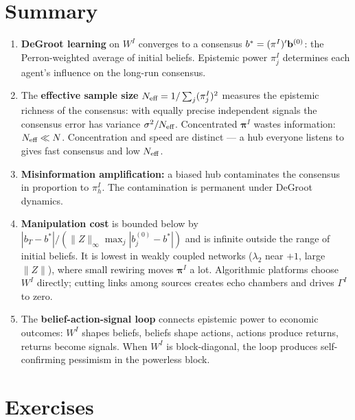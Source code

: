 \documentclass[../structural_economics_book.tex]{subfiles}
\begin{document}
\section{Summary}
\label{ch08:sec:summary}

\begin{enumerate}
\item \textbf{DeGroot learning} on $W^I$ converges to a consensus $b^* = (\pi^I)'\mathbf{b}^{(0)}$: the Perron-weighted average of initial beliefs. Epistemic power $\pi^I_j$ determines each agent's influence on the long-run consensus.

\item The \textbf{effective sample size} $N_{\text{eff}} = 1/\sum_j (\pi^I_j)^2$ measures the epistemic richness of the consensus: with equally precise independent signals the consensus error has variance $\sigma^2/N_{\text{eff}}$. Concentrated $\boldsymbol{\pi}^I$ wastes information: $N_{\text{eff}} \ll N$. Concentration and speed are distinct --- a hub everyone listens to gives fast consensus and low $N_{\text{eff}}$.

\item \textbf{Misinformation amplification:} a biased hub contaminates the consensus in proportion to $\pi^I_h$. The contamination is permanent under DeGroot dynamics.

\item \textbf{Manipulation cost} is bounded below by $|b_T - b^*| / (\|Z\|_\infty \max_j|b^{(0)}_j - b^*|)$ and is infinite outside the range of initial beliefs. It is lowest in weakly coupled networks ($\lambda_2$ near $+1$, large $\|Z\|$), where small rewiring moves $\boldsymbol{\pi}^I$ a lot. Algorithmic platforms choose $W^I$ directly; cutting links among sources creates echo chambers and drives $\Gamma^I$ to zero.

\item The \textbf{belief-action-signal loop} connects epistemic power to economic outcomes: $W^I$ shapes beliefs, beliefs shape actions, actions produce returns, returns become signals. When $W^I$ is block-diagonal, the loop produces self-confirming pessimism in the powerless block.
\end{enumerate}


\section{Exercises}
\label{ch08:sec:exercises}
\end{document}
